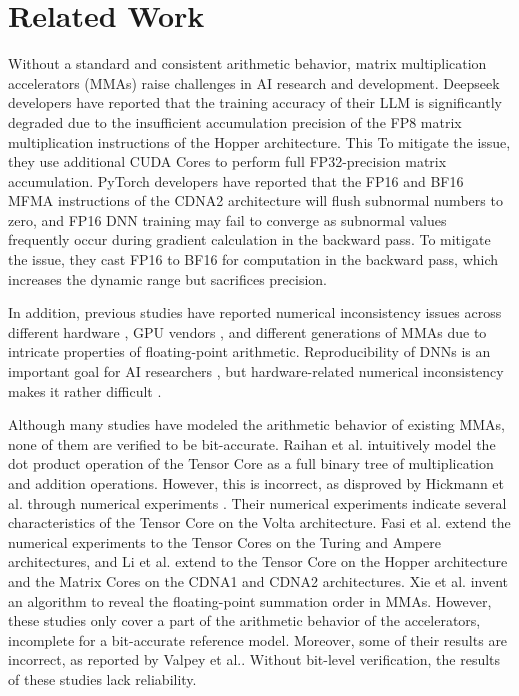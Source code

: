 \section{Related Work}


Without a standard and consistent arithmetic behavior, matrix multiplication accelerators (MMAs) raise challenges in AI research and development. Deepseek developers \cite{deepseek-ai_deepseek-v3_2024} have reported that the training accuracy of their LLM is significantly degraded due to the insufficient accumulation precision of the FP8 matrix multiplication instructions of the Hopper architecture. This To mitigate the issue, they use additional CUDA Cores to perform full FP32-precision matrix accumulation. PyTorch developers \cite{pytorch_developers_pytorch_2025} have reported that the FP16 and BF16 MFMA instructions of the CDNA2 architecture will flush subnormal numbers to zero, and FP16 DNN training may fail to converge as subnormal values frequently occur during gradient calculation in the backward pass. To mitigate the issue, they cast FP16 to BF16 for computation in the backward pass, which increases the dynamic range but sacrifices precision.

In addition, previous studies have reported numerical inconsistency issues across different hardware \cite{jezequel_estimation_2015}, GPU vendors \cite{zahid_testing_2024}, and different generations of MMAs \cite{li_discovery_2024} due to intricate properties of floating-point arithmetic. Reproducibility of DNNs is an important goal for AI researchers \cite{pham_problems_2020,chen_towards_2022,he_defeating_2025}, but hardware-related numerical inconsistency makes it rather difficult \cite{xie_revealing_2025}.

Although many studies have modeled the arithmetic behavior of existing MMAs, none of them are verified to be bit-accurate. Raihan et al. \cite{raihan_modeling_2019} intuitively model the dot product operation of the Tensor Core as a full binary tree of multiplication and addition operations. However, this is incorrect, as disproved by Hickmann et al. through numerical experiments \cite{hickmann_experimental_2019}. Their numerical experiments indicate several characteristics of the Tensor Core on the Volta architecture. Fasi et al. \cite{fasi_numerical_2021} extend the numerical experiments to the Tensor Cores on the Turing and Ampere architectures, and Li et al. \cite{li_fttn_2024} extend to the Tensor Core on the Hopper architecture and the Matrix Cores on the CDNA1 and CDNA2 architectures. Xie et al. \cite{xie_revealing_2025} invent an algorithm to reveal the floating-point summation order in MMAs. However, these studies only cover a part of the arithmetic behavior of the accelerators, incomplete for a bit-accurate reference model. Moreover, some of their results are incorrect, as reported by Valpey et al.\cite{valpey_smt_2025}. Without bit-level verification, the results of these studies lack reliability.

